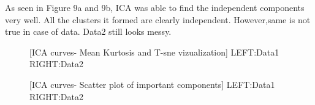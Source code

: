 \documentclass[12pt]{article}
\begin{document}
As seen in Figure 9a and 9b, ICA was able to find the independent components very well. All the clusters it formed are clearly independent. However,same is not true in case of data. Data2 still looks	messy. 
\begin{figure}
    \centering
    \caption{[ICA curves- Mean Kurtosis and T-sne vizualization] LEFT:Data1 RIGHT:Data2 }
    \label{fig:foobar}
\end{figure}






\begin{figure}
    \centering
    \caption{[ICA curves- Scatter plot of important components] LEFT:Data1 RIGHT:Data2 }
    \label{fig:foobar}
\end{figure}
\end{document}
